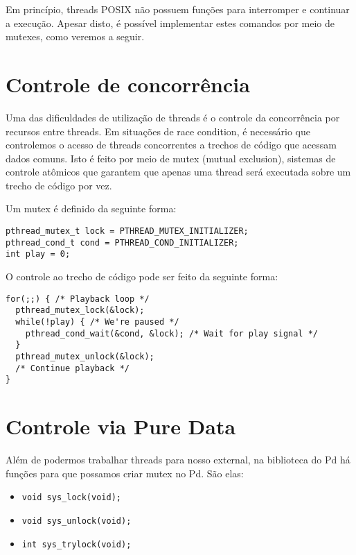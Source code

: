 Em princípio, threads POSIX não possuem funções para interromper e continuar a
execução. Apesar disto, é possível implementar estes comandos por meio de
mutexes, como veremos a seguir.

\section{Controle de concorrência}

Uma das dificuldades de utilização de threads é o controle da concorrência por
recursos entre threads. Em situações de race condition, é necessário que
controlemos o acesso de threads concorrentes a trechos de código que acessam
dados comuns. Isto é feito por meio de mutex (mutual exclusion), sistemas de
controle atômicos que garantem que apenas uma thread será executada sobre um
trecho de código por vez.

Um mutex é definido da seguinte forma:

\begin{lstlisting}
pthread_mutex_t lock = PTHREAD_MUTEX_INITIALIZER;
pthread_cond_t cond = PTHREAD_COND_INITIALIZER;
int play = 0;
\end{lstlisting}

O controle ao trecho de código pode ser feito da seguinte forma:

\begin{lstlisting}
for(;;) { /* Playback loop */
  pthread_mutex_lock(&lock);
  while(!play) { /* We're paused */
    pthread_cond_wait(&cond, &lock); /* Wait for play signal */
  }
  pthread_mutex_unlock(&lock);
  /* Continue playback */
}
\end{lstlisting}


\section{Controle via Pure Data}
Além de podermos trabalhar threads para nosso external, na biblioteca do
Pd há funções para que possamos criar mutex no Pd. São elas:


\begin{itemize}
\item \texttt{void sys\_lock(void);}
\item \texttt{void sys\_unlock(void);}
\item \texttt{int sys\_trylock(void);}
\end{itemize}
